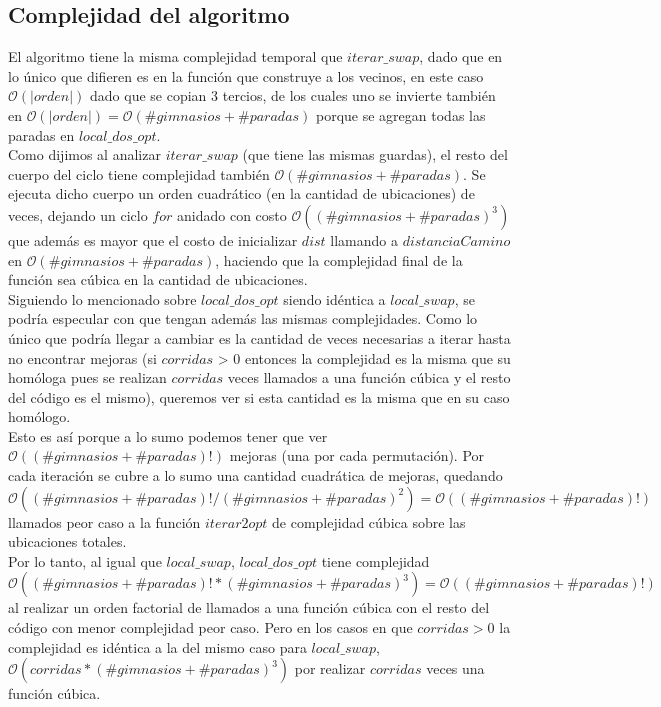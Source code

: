     \subsection{Complejidad del algoritmo}
    El algoritmo tiene la misma complejidad temporal que $iterar\_swap$, dado que en lo único que difieren es en la función que construye a los vecinos, en este caso $\mathcal{O}(|orden|)$ dado que se copian 3 tercios, de los cuales uno se invierte también en $\mathcal{O}(|orden|) = \mathcal{O}(\#gimnasios + \#paradas)$ porque se agregan todas las paradas en $local\_dos\_opt$. \\

    Como dijimos al analizar $iterar\_swap$ (que tiene las mismas guardas), el resto del cuerpo del ciclo tiene complejidad también $\mathcal{O}(\#gimnasios + \#paradas)$. Se ejecuta dicho cuerpo un orden cuadrático (en la cantidad de ubicaciones) de veces, dejando un ciclo $for$ anidado con costo $\mathcal{O}((\#gimnasios + \#paradas)^3)$ que además es mayor que el costo de inicializar $dist$ llamando a $distanciaCamino$ en $\mathcal{O}(\#gimnasios + \#paradas)$, haciendo que la complejidad final de la función sea cúbica en la cantidad de ubicaciones.
    \\

    Siguiendo lo mencionado sobre $local\_dos\_opt$ siendo idéntica a $local\_swap$, se podría especular con que tengan además las mismas complejidades. Como lo único que podría llegar a cambiar es la cantidad de veces necesarias a iterar hasta no encontrar mejoras (si $corridas$ > 0 entonces la complejidad es la misma que su homóloga pues se realizan $corridas$ veces llamados a una función cúbica y el resto del código es el mismo), queremos ver si esta cantidad es la misma que en su caso homólogo.
    \\

    Esto es así porque a lo sumo podemos tener que ver $\mathcal{O}((\#gimnasios + \#paradas)!)$ mejoras (una por cada permutación). Por cada iteración se cubre a lo sumo una cantidad cuadrática de mejoras, quedando $\mathcal{O}((\#gimnasios + \#paradas)!/(\#gimnasios + \#paradas)^2) = \mathcal{O}((\#gimnasios + \#paradas)!)$ llamados peor caso a la función $iterar2opt$ de complejidad cúbica sobre las ubicaciones totales.
    \\

    Por lo tanto, al igual que $local\_swap$, $local\_dos\_opt$ tiene complejidad $\mathcal{O}((\#gimnasios + \#paradas)!*(\#gimnasios + \#paradas)^3) = \mathcal{O}((\#gimnasios + \#paradas)!)$ al realizar un orden factorial de llamados a una función cúbica con el resto del código con menor complejidad peor caso. Pero en los casos en que $corridas > 0$ la complejidad es idéntica a la del mismo caso para $local\_swap$, $\mathcal{O}(corridas*(\#gimnasios + \#paradas)^3)$ por realizar $corridas$ veces una función cúbica.
